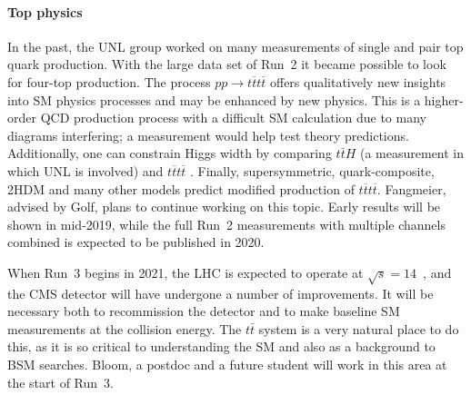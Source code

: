 \paragraph{Top physics}
%

In the past, the UNL group worked on many measurements of single and pair top quark production. With the large data set of Run~2 it became possible to look for four-top production. The process $pp\to t\overline{t}t\overline{t}$ offers qualitatively new insights into SM physics processes and may be enhanced by new physics. This is a higher-order QCD production process with a difficult SM calculation due to many diagrams interfering; a measurement would help test theory predictions. Additionally, one can constrain Higgs width by comparing $t\bar{t}H$ (a measurement in which UNL is involved) and $t\overline{t}t\overline{t}$ \cite{bib:Higgs-width-tttt}. Finally, supersymmetric, quark-composite, 2HDM and many other models predict modified production of $t\overline{t}t\overline{t}$. Fangmeier, advised by Golf, plans to continue working on this topic. Early results will be shown in mid-2019, while the full Run~2 measurements with multiple channels combined is expected to be published in 2020.

When Run~3 begins in 2021, the LHC is expected to operate at $\sqrt{s} = 14$~\TeV, and the CMS detector will have undergone a number of improvements.  It will be necessary both to recommission the detector and to make 
baseline SM measurements at the collision energy.  The $t\bar{t}$ system is a very natural place to do this, as it is so critical to understanding the SM and also as a background to BSM searches.  
%
Bloom, a postdoc and a future student will work in this area at the start of Run~3.

